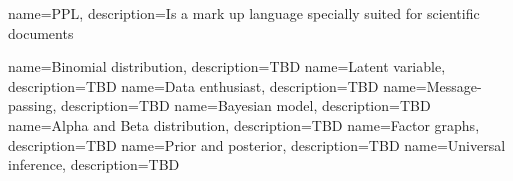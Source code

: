\usepackage{glossaries}
 
\makeglossaries
 
{
    name=PPL,
    description={Is a mark up language specially suited 
    for scientific documents}
}

{
    name=Binomial distribution,
    description={TBD}
}
{
    name=Latent variable,
    description={TBD}
}
{
    name=Data enthusiast,
    description={TBD}
}
{
    name=Message-passing,
    description={TBD}
}
{
    name=Bayesian model,
    description={TBD}
}
{
    name=Alpha and Beta distribution,
    description={TBD}
}
{
    name=Factor graphs,
    description={TBD}
}
{
    name=Prior and posterior,
    description={TBD}
}
{
    name=Universal inference,
    description={TBD}
}